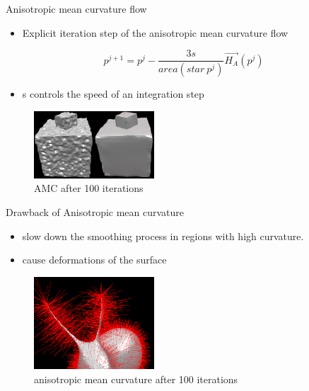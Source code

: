 \documentclass{beamer}
\begin{document}
\begin{frame}{Anisotropic mean curvature flow}
\begin{itemize}
\item Explicit iteration step of the anisotropic mean curvature flow
\end{itemize}
\begin{equation*}
p^{j+1} = p^{j} - \dfrac{3s}{area(star\ p^j)}\vec{H_A}(p^j)
\end{equation*}
\begin{itemize}
\item s controls the speed of an integration step
\end{itemize}
\begin{figure}[htb]
\centering
\includegraphics[width=0.4\textwidth]{aniso_cube.PNG}
\caption{AMC after 100 iterations}
\label{fig:aniso_cube}
\end{figure}
\end{frame}

\begin{frame}{Drawback of Anisotropic mean curvature}
\begin{itemize}
\item slow down the smoothing process in regions with high curvature. 
\item cause deformations of the surface
\end{itemize}
\begin{figure}[htb]
\centering
\includegraphics[width=0.4\textwidth]{aniso_bunny_100it.PNG}
\caption{anisotropic mean curvature after 100 iterations}
\label{fig:deform}
\end{figure}
\end{frame}
\end{document}

